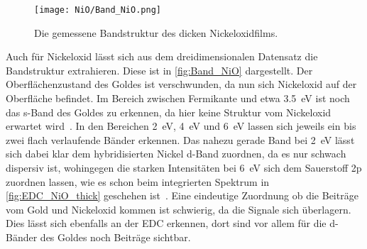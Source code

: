         \begin{figure}
            \centering
            \texttt{[image: NiO/Band\_NiO.png]}
            \caption{Die gemessene Bandstruktur des dicken Nickeloxidfilms.}
            \label{fig:Band_NiO}
        \end{figure}
        Auch für Nickeloxid lässt sich aus dem dreidimensionalen Datensatz die Bandstruktur extrahieren.
        Diese ist in \autoref{fig:Band_NiO} dargestellt. %
        Der Oberflächenzustand des Goldes ist verschwunden, da nun sich Nickeloxid auf der Oberfläche befindet.
        Im Bereich zwischen Fermikante und etwa \SI{3.5}{\electronvolt} ist noch das s-Band des Goldes zu erkennen, da hier keine Struktur vom Nickeloxid erwartet wird~\cite{NiO_12}.
        In den Bereichen \SI{2}{\electronvolt}, \SI{4}{\electronvolt} und \SI{6}{\electronvolt} lassen sich jeweils ein bis zwei flach verlaufende Bänder erkennen.
        Das nahezu gerade Band bei \SI{2}{\electronvolt} lässt sich dabei klar dem hybridisierten Nickel d-Band zuordnen, da es nur schwach dispersiv ist, wohingegen die starken Intensitäten bei \SI{6}{\electronvolt} sich dem Sauerstoff 2p zuordnen lassen, wie es schon beim integrierten Spektrum in \autoref{fig:EDC_NiO_thick} geschehen ist~\cite{Hüfner}.
        Eine eindeutige Zuordnung ob die Beiträge vom Gold und Nickeloxid kommen ist schwierig, da die Signale sich überlagern. %
        Dies lässt sich ebenfalls an der EDC erkennen, dort sind vor allem für die d-Bänder des Goldes noch Beiträge sichtbar.
        
    \FloatBarrier
